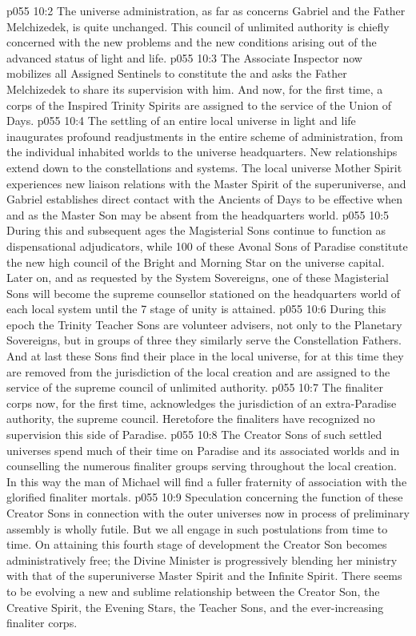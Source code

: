 \vs p055 10:2 The universe administration, as far as concerns Gabriel and the Father Melchizedek, is quite unchanged. This council of unlimited authority is chiefly concerned with the new problems and the new conditions arising out of the advanced status of light and life.
\vs p055 10:3 \pc The Associate Inspector now mobilizes all Assigned Sentinels to constitute the  and asks the Father Melchizedek to share its supervision with him. And now, for the first time, a corps of the Inspired Trinity Spirits are assigned to the service of the Union of Days.
\vs p055 10:4 \pc The settling of an entire local universe in light and life inaugurates profound readjustments in the entire scheme of administration, from the individual inhabited worlds to the universe headquarters. New relationships extend down to the constellations and systems. The local universe Mother Spirit experiences new liaison relations with the Master Spirit of the superuniverse, and Gabriel establishes direct contact with the Ancients of Days to be effective when and as the Master Son may be absent from the headquarters world.
\vs p055 10:5 During this and subsequent ages the Magisterial Sons continue to function as dispensational adjudicators, while 100 of these Avonal Sons of Paradise constitute the new high council of the Bright and Morning Star on the universe capital. Later on, and as requested by the System Sovereigns, one of these Magisterial Sons will become the supreme counsellor stationed on the headquarters world of each local system until the 7 stage of unity is attained.
\vs p055 10:6 During this epoch the Trinity Teacher Sons are volunteer advisers, not only to the Planetary Sovereigns, but in groups of three they similarly serve the Constellation Fathers. And at last these Sons find their place in the local universe, for at this time they are removed from the jurisdiction of the local creation and are assigned to the service of the supreme council of unlimited authority.
\vs p055 10:7 \pc The finaliter corps now, for the first time, acknowledges the jurisdiction of an extra\hyp{}Paradise authority, the supreme council. Heretofore the finaliters have recognized no supervision this side of Paradise.
\vs p055 10:8 The Creator Sons of such settled universes spend much of their time on Paradise and its associated worlds and in counselling the numerous finaliter groups serving throughout the local creation. In this way the man of Michael will find a fuller fraternity of association with the glorified finaliter mortals.
\vs p055 10:9 \pc Speculation concerning the function of these Creator Sons in connection with the outer universes now in process of preliminary assembly is wholly futile. But we all engage in such postulations from time to time. On attaining this fourth stage of development the Creator Son becomes administratively free; the Divine Minister is progressively blending her ministry with that of the superuniverse Master Spirit and the Infinite Spirit. There seems to be evolving a new and sublime relationship between the Creator Son, the Creative Spirit, the Evening Stars, the Teacher Sons, and the ever\hyp{}increasing finaliter corps.
